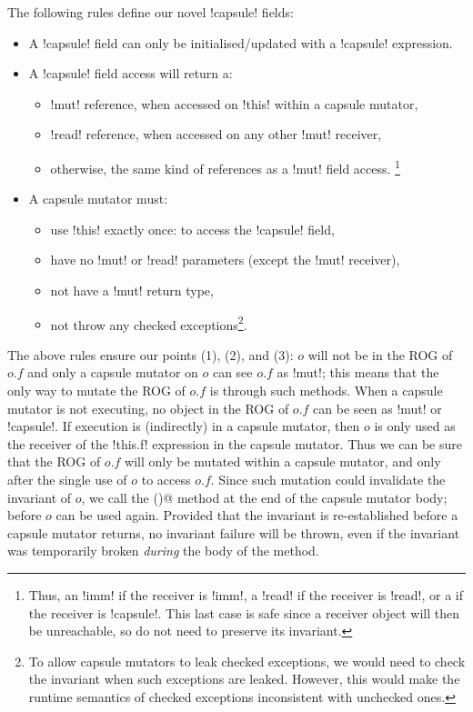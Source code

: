 The following rules define our novel \Q!capsule! fields:
\begin{itemize}
\item A \Q!capsule! field can only be initialised/updated with a \Q!capsule! expression.
\item A \Q!capsule! field access will return a:
\begin{itemize}
\item \Q!mut! reference, when accessed on \Q!this! within a capsule mutator,
\item \Q!read! reference, when accessed on any other \Q!mut! receiver,
\item otherwise, the same kind of references as a \Q!mut! field access.
\footnote{Thus, 
an \Q!imm! if the receiver is \Q!imm!, a \Q!read! if the receiver is \Q!read!, or a \Q@capsule@ if the receiver is
\Q!capsule!. This last case is safe since a \Q@capsule@ receiver object will then be unreachable, so do not need to preserve its invariant.}
\end{itemize}
\item A capsule mutator must:
\begin{itemize}
\item use \Q!this! exactly once: to access the \Q!capsule! field,
\item have no \Q!mut! or \Q!read! parameters (except the \Q!mut! receiver),
\item not have a \Q!mut! return type,
\item not throw any checked exceptions\footnote{To allow capsule mutators to leak checked exceptions, we would need to check the invariant when such exceptions are leaked. However, this would make the runtime semantics of checked exceptions inconsistent with unchecked ones.}.
\end{itemize}
\end{itemize}	
	
\noindent The above rules ensure our points (1), (2), and (3):
$o$ will not be in the ROG of $o.f$ and
only a capsule mutator on $o$ can see $o.f$ as \Q!mut!; this means that the only way to mutate the ROG of $o.f$ is through such methods. When a capsule mutator is not executing, no object in the ROG of $o.f$ can be seen as \Q!mut! or \Q!capsule!. %
If execution is (indirectly) in a capsule mutator, then $o$ is only used as the receiver of the \Q!this.f! expression in the capsule mutator.
Thus we can be sure that the ROG of $o.f$ will only be mutated within a capsule mutator, and only after the single use of $o$ to access $o.f$.
Since such mutation could invalidate the invariant of $o$, we call the \Q@invariant()@ method at the end of the capsule mutator body; before $o$ can be used again. Provided that the invariant is re-established before a capsule mutator returns, no invariant failure will be thrown, even if the invariant was temporarily broken \emph{during} the body of the method.

